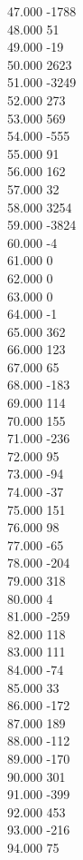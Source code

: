 { 47.000	-1788 \\
 48.000	51 \\
 49.000	-19 \\
 50.000	2623 \\
 51.000	-3249 \\
 52.000	273 \\
 53.000	569 \\
 54.000	-555 \\
 55.000	91 \\
 56.000	162 \\
 57.000	32 \\
 58.000	3254 \\
 59.000	-3824 \\
 60.000	-4 \\
 61.000	0 \\
 62.000	0 \\
 63.000	0 \\
 64.000	-1 \\
 65.000	362 \\
 66.000	123 \\
 67.000	65 \\
 68.000	-183 \\
 69.000	114 \\
 70.000	155 \\
 71.000	-236 \\
 72.000	95 \\
 73.000	-94 \\
 74.000	-37 \\
 75.000	151 \\
 76.000	98 \\
 77.000	-65 \\
 78.000	-204 \\
 79.000	318 \\
 80.000	4 \\
 81.000	-259 \\
 82.000	118 \\
 83.000	111 \\
 84.000	-74 \\
 85.000	33 \\
 86.000	-172 \\
 87.000	189 \\
 88.000	-112 \\
 89.000	-170 \\
 90.000	301 \\
 91.000	-399 \\
 92.000	453 \\
 93.000	-216 \\
 94.000	75 \\
}
